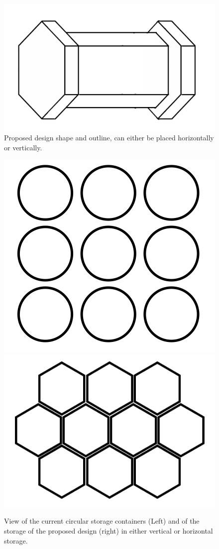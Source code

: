 \begin{figure}[H]
\centering
\includegraphics[scale=0.7]{Media/ProductDesign/Proposed Design.png}
\caption{Proposed design shape and outline, can either be placed horizontally or vertically.}
\label{Proposed Design}
\end{figure}

\begin{figure}[H]
\centering
\includegraphics[scale=0.7]{Media/ProductDesign/Circle.png}
\includegraphics[scale=0.8]{Media/ProductDesign/Hex.png}
\caption{View of the current circular storage containers (Left) and of the storage of the proposed design (right) in either vertical or horizontal storage.}
\label{Circle and Hex Images}
\end{figure}

